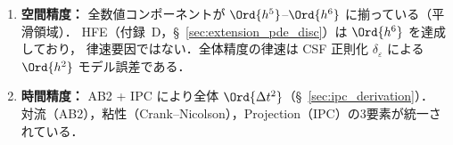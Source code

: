\begin{tcolorbox}[warnbox, title={精度ミスマッチと設計上のトレードオフ}]
\begin{enumerate}
  \item \textbf{空間精度：}
        全数値コンポーネントが $\Ord{h^5}$--$\Ord{h^6}$ に揃っている（平滑領域）．
        HFE（付録~D，§~\ref{sec:extension_pde_disc}）は $\Ord{h^6}$ を達成しており，
        律速要因ではない．全体精度の律速は CSF 正則化 $\delta_\varepsilon$ による $\Ord{h^2}$ モデル誤差である．

  \item \textbf{時間精度：}
        AB2 + IPC により全体 $\Ord{\Delta t^2}$（§~\ref{sec:ipc_derivation}）．
        対流（AB2），粘性（Crank--Nicolson），Projection（IPC）の3要素が統一されている．
\end{enumerate}
\end{tcolorbox}

